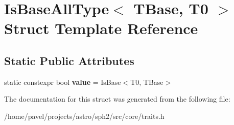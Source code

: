 \hypertarget{structIsBaseAllType_3_01TBase_00_01T0_01_4}{}\section{Is\+Base\+All\+Type$<$ T\+Base, T0 $>$ Struct Template Reference}
\label{structIsBaseAllType_3_01TBase_00_01T0_01_4}
\subsection*{Static Public Attributes}
\begin{DoxyCompactItemize}
\item 
\hypertarget{structIsBaseAllType_3_01TBase_00_01T0_01_4_a4059500c5a67420cb879703f0cd8e712}{}\label{structIsBaseAllType_3_01TBase_00_01T0_01_4_a4059500c5a67420cb879703f0cd8e712} 
static constexpr bool {\bfseries value} = Is\+Base$<$T0, T\+Base$>$
\end{DoxyCompactItemize}


The documentation for this struct was generated from the following file\+:\begin{DoxyCompactItemize}
\item 
/home/pavel/projects/astro/sph2/src/core/traits.\+h\end{DoxyCompactItemize}
